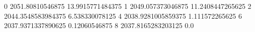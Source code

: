 0 2051.80810546875 13.9915771484375
1 2049.057373046875 11.2408447265625
2 2044.3548583984375 6.538330078125
4 2038.9281005859375 1.111572265625
6 2037.9371337890625 0.12060546875
8 2037.8165283203125 0.0
